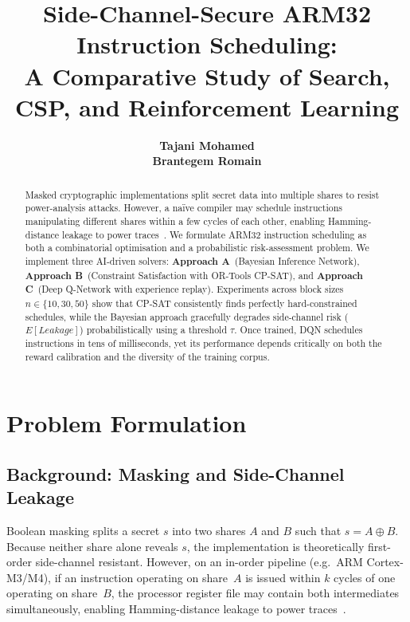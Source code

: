 \documentclass[letterpaper]{article}
\title{Side-Channel-Secure ARM32 Instruction Scheduling:\\
A Comparative Study of Search, CSP, and Reinforcement Learning}
\author{
  \textbf{Tajani Mohamed}\\
  \textbf{Brantegem Romain}
}
\newcommand{\approachA}{\textcolor{bayesColor}{\textbf{Approach A}}}
\newcommand{\approachB}{\textcolor{cspColor}{\textbf{Approach B}}}
\newcommand{\approachC}{\textcolor{dqnColor}{\textbf{Approach C}}}
\begin{document}
\maketitle

\begin{abstract}
  Masked cryptographic implementations split secret data into multiple
  shares to resist power-analysis attacks.  However, a na\"ive compiler
  may schedule instructions manipulating different shares within a few
  cycles of each other, enabling Hamming-distance leakage to power
  traces~\cite{kocher1999}.  We formulate ARM32
  instruction scheduling as both a combinatorial optimisation
  and a probabilistic risk-assessment problem. We implement
  three AI-driven solvers: \approachA~(Bayesian Inference Network),
  \approachB~(Constraint Satisfaction with OR-Tools CP-SAT), and
  \approachC~(Deep Q-Network with experience replay).
  Experiments across block sizes $n \in \{10, 30, 50\}$ show that CP-SAT
  consistently finds perfectly hard-constrained schedules, while the Bayesian
  approach gracefully degrades side-channel risk ($E[Leakage]$) probabilistically
  using a threshold $\tau$. Once trained, DQN schedules instructions in tens of milliseconds,
  yet its performance depends critically on both the reward
  calibration and the diversity of the training corpus.
\end{abstract}

\section{Problem Formulation}
\label{sec:problem}

\subsection{Background: Masking and Side-Channel Leakage}

Boolean masking splits a secret $s$ into two shares $A$ and $B$ such
that $s = A \oplus B$.  Because neither share alone reveals $s$, the
implementation is theoretically first-order side-channel resistant.
However, on an in-order pipeline (e.g.\ ARM Cortex-M3/M4), if an
instruction operating on share~$A$ is issued within $k$ cycles of one
operating on share~$B$, the processor register file may contain both
intermediates simultaneously, enabling Hamming-distance leakage to power
traces~\cite{kocher1999}.
\end{document}
